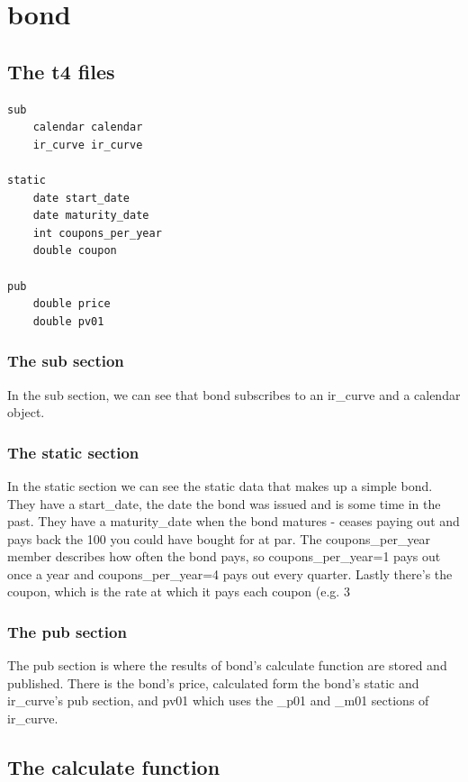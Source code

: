 \documentclass{report}
\begin{document}
\section{bond}

\subsection{The t4 files}

\begin{verbatim}
sub
    calendar calendar
    ir_curve ir_curve

static
    date start_date
    date maturity_date
    int coupons_per_year
    double coupon

pub
    double price
    double pv01
\end{verbatim}

\subsubsection{The sub section}

In the sub section, we can see that bond subscribes to an ir_curve and a calendar object.

\subsubsection{The static section}

In the static section we can see the static data that makes up a simple bond. They have a start_date, the date the bond was issued and is some time in the past. They have a maturity_date when the bond matures - ceases paying out and pays back the 100 you could have bought for at par. The coupons_per_year member describes how often the bond pays, so coupons_per_year=1 pays out once a year and coupons_per_year=4 pays out every quarter. Lastly there's the coupon, which is the rate at which it pays each coupon (e.g. 3%

\subsubsection{The pub section}

The pub section is where the results of bond's calculate function are stored and published. There is the bond's price, calculated form the bond's static and ir_curve's pub section, and pv01 which uses the _p01 and _m01 sections of ir_curve.

\subsection{The calculate function}
\end{document}
